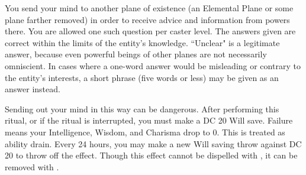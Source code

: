 \begin{spelleffect}
You send your mind to another plane of existence (an Elemental Plane or some plane farther removed) in order to receive advice and information from powers there. You are allowed one such question per caster level. The answers given are correct within the limits of the entity's knowledge. ``Unclear" is a legitimate answer, because even powerful beings of other planes are not necessarily omniscient. In cases where a one-word answer would be misleading or contrary to the entity's interests, a short phrase (five words or less) may be given as an answer instead.

Sending out your mind in this way can be dangerous. After performing this ritual, or if the ritual is interrupted, you must make a DC 20 Will save. Failure means your Intelligence, Wisdom, and Charisma drop to 0. This is treated as ability drain. Every 24 hours, you may make a new Will saving throw against DC 20 to throw off the effect. Though this effect cannot be dispelled with , it can be removed with .  \end{spelleffect}

